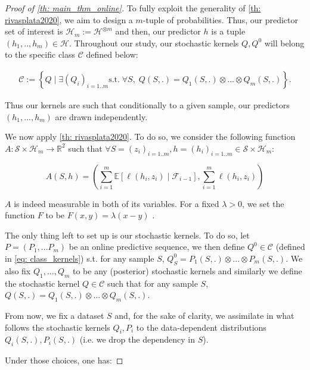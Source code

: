 \begin{proof}[Proof of \cref{th: main_thm_online}]


To fully exploit the generality of \cref{th: rivasplata2020}, we aim to design a $m$-tuple of probabilities. Thus, our predictor set of interest is $\mathcal{H}_m:= \mathcal{H}^{\otimes m}$ and then, our predictor $h$ is a tuple $(h_1,..,h_m)\in\mathcal{H}$. Throughout our study, our stochastic kernels $Q,Q^0$ will belong to the specific class $\mathcal{C}$ defined below:

\begin{align}
  \label{eq: class_kernels}
  \mathcal{C}:= \left\{ Q \mid   \exists (Q_i)_{i=1..m}\text{s.t.}\; \forall S,\;  Q(S,.) = Q_1(S,.)\otimes...\otimes Q_m(S,.)      \right\}.
\end{align}


\noindent Thus our kernels are such that conditionally to a given sample, our predictors $(h_1,...,h_m)$ are drawn independently.

\noindent We now apply \cref{th: rivasplata2020}. To do so, we consider the following function $A: \mathcal{S}\times \mathcal{H}_m \rightarrow \mathbb{R}^2$ such that $\forall S= (z_i)_{i=1..m},h= (h_i)_{i=1..m}\in \mathcal{S}\times \mathcal{H}_m$:

\[  A(S,h)= \left(\sum_{i=1}^m \mathbb{E}[\ell(h_i,z_i)\mid \mathcal{F}_{i-1}], \sum_{i=1}^m \ell(h_i,z_i)  \right)   \]

\noindent $A$ is indeed measurable in both of its variables. For a fixed $\lambda>0$, we set the function $F$ to be $F(x,y)= \lambda(x-y)$ .


 \noindent The only thing left to set up is our stochastic kernels. To do so, let $P=(P_1,...P_m)$ be an online predictive sequence, we then define $Q^0\in\mathcal{C}$ (defined in \cref{eq: class_kernels}) s.t. for any sample $S$, $Q^0_S = P_1(S,.)\otimes...\otimes P_m(S,.)$. We also fix $Q_1,...,Q_m$ to be any (posterior)
 stochastic kernels and similarly we define the stochastic kernel $Q\in\mathcal{C}$ such that for any sample $S$, $Q(S,.) = Q_1(S,.)\otimes...\otimes Q_m(S,.)$.

 From now, we fix a dataset $S$ and, for the sake of clarity, we assimilate in what follows the stochastic kernels $Q_i,P_i$ to the data-dependent distributions $Q_i(S,.), P_i(S,.)$ (i.e. we drop the dependency in $S$).

\noindent Under those choices, one has:


\end{proof}
